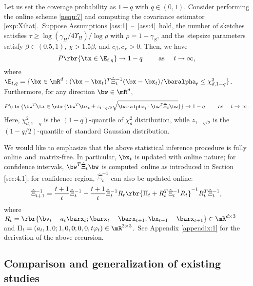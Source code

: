 \begin{corollary}\label{sec4:cor1}

Let us set the coverage probability as $1-q$ with $q\in (0,1)$. Consider performing the online scheme \eqref{nequ:7} and computing the covariance estimator \eqref{exp:Xihat}.~Suppose Assumptions \mbox{\ref{ass:1} -- \ref{ass:4}}~hold, the number of sketches satisfies $\tau\geq \log(\gamma_H/4\Upsilon_H)/\log \rho$ with $\rho = 1-\gamma_S$, and the~stepsize parameters satisfy $\beta\in(0.5,1)$, $\chi> 1.5\beta$, and $c_{\beta},c_{\chi}>0$. Then, we have 
\begin{equation*}
P\rbr{\tx \in \E_{t,q}} \rightarrow 1 - q\quad\quad \text{ as }\quad t\rightarrow\infty,
\end{equation*}
where $\E_{t,q} = \{\bx\in\mR^d: (\bx-\bx_t)^T\hat{\Xi}_t^{-1}(\bx-\bx_t)/\baralpha_t \leq \chi_{d,1-q}^2\}$. Furthermore, for any direction $\bw\in\mR^d$,
\begin{equation*}
P\rbr{\bw^T\tx \in \sbr{\bw^T\bx_t \pm z_{1-q/2}\sqrt{\baralpha_t\cdot \bw^T\hat{\Xi}_t\bw}}} \rightarrow 1-q \quad\quad \text{ as }\quad t\rightarrow\infty.
\end{equation*}
Here, $\chi_{d,1-q}^2$ is the $(1-q)$-quantile of $\chi_d^2$ distribution, while $z_{1-q/2}$ is the $(1-q/2)$-quantile of~standard Gaussian distribution.
\end{corollary}


We would like to emphasize that the above statistical inference procedure is fully online~and~matrix-free. In particular, $\bx_t$ is updated with online nature; for confidence intervals, $\bw^T\hat{\Xi}_t\bw$ is computed~online as introduced in Section \ref{sec:4.1}; for confidence region, $\hat{\Xi}_t^{-1}$ can also be updated online:
\begin{equation*}
\hat{\Xi}_{t+1}^{-1} = \frac{t+1}{t}\hat{\Xi}_{t}^{-1} - \frac{t+1}{t}\hat{\Xi}_{t}^{-1} R_t\rbr{\Pi_t + R_t^T\hat{\Xi}_{t}^{-1}R_t}^{-1} R_t^T\hat{\Xi}_{t}^{-1},
\end{equation*}
where $R_t = \rbr{\bv_t - a_t\barx_t; \barx_t - \barx_{t+1}; \bx_{t+1} - \barx_{t+1}} \in \mR^{d\times 3}$ and $\Pi_t = (a_t, 1, 0; 1, 0, 0;0,0, t\varphi_t) \in\mR^{3\times 3}$.~See Appendix \ref{appendix:1} for the derivation of the above recursion.



\subsection{Comparison and generalization of existing studies}\label{sec:4.3}

